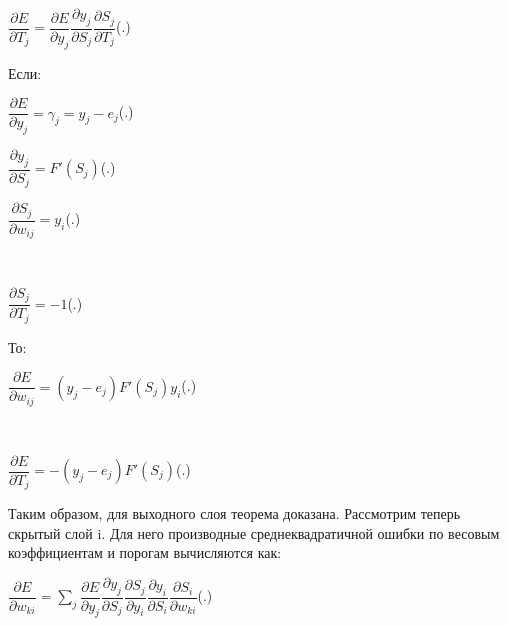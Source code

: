 	\formulaspace \par \redline 
	$\dfrac{\partial E}{\partial T_{j}} = \dfrac{\partial E}{\partial y_j} \dfrac{\partial y_j}{\partial S_j} \dfrac{\partial S_j}{\partial T_{j}}$\hfill (\thechaptercntr .\theformulacntr) \redline
	\formulaspace \addtocounter{formulacntr}{1}
	
	\par \redline Если:
	
	\formulaspace \par \redline 
	$\dfrac{\partial E}{\partial y_j} = \gamma_{j} =  y_{j} - e_{j}$\hfill (\thechaptercntr .\theformulacntr) \redline
	\formulaspace \addtocounter{formulacntr}{1}
	
	\formulaspace \par \redline 
	$\dfrac{\partial y_j}{\partial S_j} =  F'(S_{j})$\hfill (\thechaptercntr .\theformulacntr) \redline
	\formulaspace \addtocounter{formulacntr}{1}
	
	\formulaspace \par \redline 
	$\dfrac{\partial S_j}{\partial w_{ij}} =  y_{i}$\hfill (\thechaptercntr .\theformulacntr) \redline
	\formulaspace \addtocounter{formulacntr}{1}\\
	
	\formulaspace \par \redline 
	$\dfrac{\partial S_j}{\partial T_{j}} = -1 $\hfill (\thechaptercntr .\theformulacntr) \redline
	\formulaspace \addtocounter{formulacntr}{1}
	
	\par \redline То:
	
		\formulaspace \par \redline 
	$\dfrac{\partial E}{\partial w_{ij}} = (y_{j} - e_{j}) F'(S_{j}) y_{i}$\hfill (\thechaptercntr .\theformulacntr) \redline
	\formulaspace \addtocounter{formulacntr}{1}\\
	
	\formulaspace \par \redline 
	$\dfrac{\partial E}{\partial T_{j}} = - (y_{j} - e_{j})  F'(S_{j})$\hfill (\thechaptercntr .\theformulacntr) \redline
	\formulaspace \addtocounter{formulacntr}{1}
	
	\par \redline Таким образом, для выходного слоя теорема доказана. Рассмотрим теперь скрытый слой i. Для него производные среднеквадратичной ошибки по весовым коэффициентам и порогам вычисляются как:
		
	\formulaspace \par \redline 
	$\dfrac{\partial E}{\partial w_{ki}} =  \sum \limits _{j}^{} \dfrac{\partial E}{\partial y_j} \dfrac{\partial y_j}{\partial S_j} \dfrac{\partial S_j}{\partial y_{i}}\dfrac{\partial y_i}{\partial S_i} \dfrac{\partial S_i}{\partial w_{ki}}$\hfill (\thechaptercntr .\theformulacntr) \redline
	\formulaspace \addtocounter{formulacntr}{1}
	
